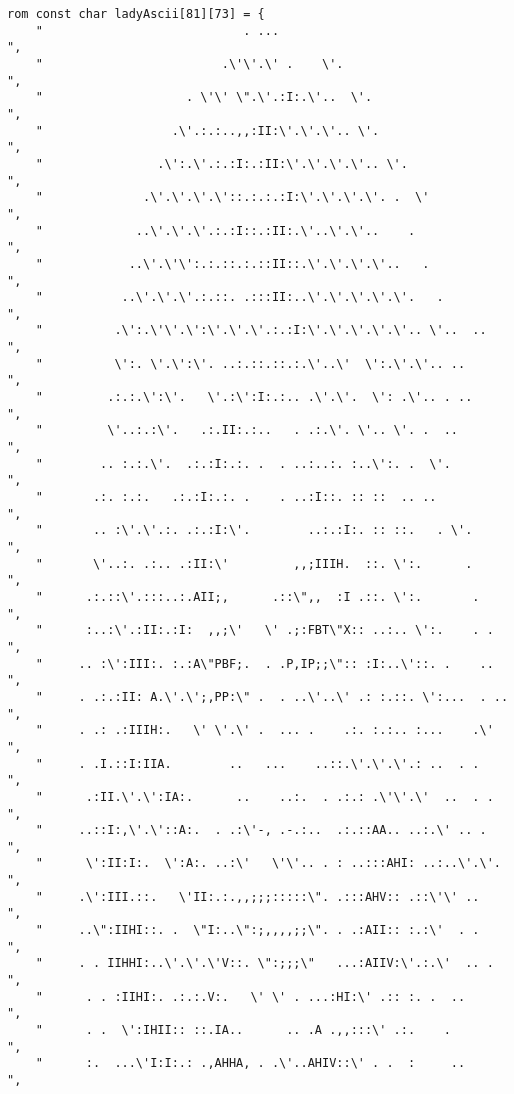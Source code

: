\begin{lstlisting}
rom const char ladyAscii[81][73] = {
	"                            . ...                                       ",
	"                         .\'\'.\' .    \'.                                  ",
	"                    . \'\' \".\'.:I:.\'..  \'.                                ",
	"                  .\'.:.:..,,:II:\'.\'.\'.. \'.                              ",
	"                .\':.\'.:.:I:.:II:\'.\'.\'.\'.. \'.                            ",
	"              .\'.\'.\'.\'::.:.:.:I:\'.\'.\'.\'. .  \'                           ",
	"             ..\'.\'.\'.:.:I::.:II:.\'..\'.\'..    .                          ",
	"            ..\'.\'\':.:.::.:.::II::.\'.\'.\'.\'..   .                         ",
	"           ..\'.\'.\'.:.::. .:::II:..\'.\'.\'.\'.\'.   .                        ",
	"          .\':.\'\'.\':\'.\'.\'.:.:I:\'.\'.\'.\'.\'.. \'..  ..                       ",
	"          \':. \'.\':\'. ..:.::.::.:.\'..\'  \':.\'.\'.. ..                      ",
	"         .:.:.\':\'.   \'.:\':I:.:.. .\'.\'.  \': .\'.. . ..                    ",
	"         \'..:.:\'.   .:.II:.:..   . .:.\'. \'.. \'. .  ..                   ",
	"        .. :.:.\'.  .:.:I:.:. .  . ..:..:. :..\':. .  \'.                  ",
	"       .:. :.:.   .:.:I:.:. .    . ..:I::. :: ::  .. ..                 ",
	"       .. :\'.\'.:. .:.:I:\'.        ..:.:I:. :: ::.   . \'.                ",
	"       \'..:. .:.. .:II:\'         ,,;IIIH.  ::. \':.      .               ",
	"      .:.::\'.:::..:.AII;,      .::\",,  :I .::. \':.       .              ",
	"      :..:\'.:II:.:I:  ,,;\'   \' .;:FBT\"X:: ..:.. \':.    . .              ",
	"     .. :\':III:. :.:A\"PBF;.  . .P,IP;;\":: :I:..\'::. .    ..             ",
	"     . .:.:II: A.\'.\';,PP:\" .  . ..\'..\' .: :.::. \':...  . ..             ",
	"     . .: .:IIIH:.   \' \'.\' .  ... .    .:. :.:.. :...    .\'             ",
	"     . .I.::I:IIA.        ..   ...    ..::.\'.\'.\'.: ..  . .              ",
	"      .:II.\'.\':IA:.      ..    ..:.  . .:.: .\'\'.\'  ..  . .              ",
	"     ..::I:,\'.\'::A:.  . .:\'-, .-.:..  .:.::AA.. ..:.\' .. .              ",
	"      \':II:I:.  \':A:. ..:\'   \'\'.. . : ..:::AHI: ..:..\'.\'.               ",
	"     .\':III.::.   \'II:.:.,,;;;:::::\". .:::AHV:: .::\'\' ..                ",
	"     ..\":IIHI::. .  \"I:..\":;,,,,;;\". . .:AII:: :.:\'  . .                ",
	"     . . IIHHI:..\'.\'.\'V::. \":;;;\"   ...:AIIV:\'.:.\'  .. .                ",
	"      . . :IIHI:. .:.:.V:.   \' \' . ...:HI:\' .:: :. .  ..                ",
	"      . .  \':IHII:: ::.IA..      .. .A .,,:::\' .:.    .                 ",
	"      :.  ...\'I:I:.: .,AHHA, . .\'..AHIV::\' . .  :     ..                ",

\end{lstlisting}

